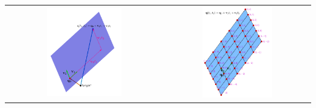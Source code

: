 \documentclass{article}
\begin{document}
\begin{tabular}{cc}
\parbox{0.5\textwidth}{
\includegraphics[width = 0.5\textwidth]{vector_equation_plane}
} & \parbox{0.5\textwidth}{
\includegraphics[width = 0.5\textwidth]{plane_parameterization}
}
\end{tabular}
\end{document}
